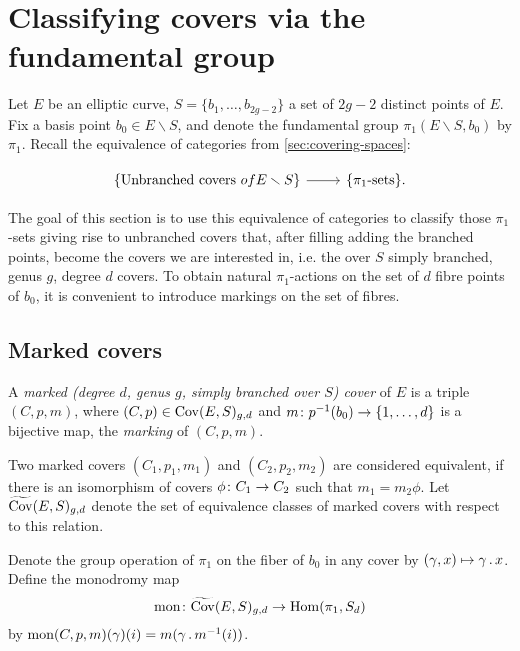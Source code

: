 \section{Classifying covers via the fundamental group}

Let $E$ be an elliptic curve, $S=\{b_1,\dotsc,b_{2g-2}\}$ a set of $2g-2$ distinct points of $E$. Fix a basis point $b_0\in E\smallsetminus S$, and denote the fundamental group $\pi_1(E\smallsetminus S, b_0)$ by $\pi_1$.
Recall the equivalence of categories from \ref{sec:covering-spaces}:

\[
 \begin{tikzcd}
  \{\text{Unbranched covers } of E\smallsetminus S\} \arrow{r} & \{\pi_1\text{-sets}\}.
 \end{tikzcd}
\]

The goal of this section is to use this equivalence of categories to classify those $\pi_1$-sets giving rise to unbranched covers that, after filling adding the branched points, become the covers we are interested in, i.e. the over $S$ simply branched, genus $g$, degree $d$ covers. To obtain natural $\pi_1$-actions on the set of $d$ fibre points of $b_0$, it is convenient to introduce markings on the set of fibres.

\subsection{Marked covers}

\begin{defi}
 A \emph{marked (degree $d$, genus $g$, simply branched over $S$) cover} of $E$ is a triple $(C,p,m)$, where $(C,p)\in \operatorname{Cov}(E,S)_{g,d}$ and $m\colon p^{-1}(b_0)\to \{1,\dotsc,d\}$ is a bijective map, the \emph{marking} of $(C,p,m)$.
 
 Two marked covers $(C_1,p_1,m_1)$ and $(C_2,p_2,m_2)$ are considered equivalent, if there is an isomorphism of covers $\phi\colon C_1 \to C_2$ such that $m_1=m_2\phi$. Let $\widetilde{\operatorname{Cov}}(E,S)_{g,d}$ denote the set of equivalence classes of marked covers with respect to this relation.
\end{defi}

\begin{defi}
 Denote the group operation of $\pi_1$ on the fiber of $b_0$ in any cover by $(\gamma,x)\mapsto \gamma\,.\, x$. Define the monodromy map \[\text{mon}\colon \widetilde{\operatorname{Cov}}(E,S)_{g,d} \to \operatorname{Hom}(\pi_1, S_d)\]
 by $\text{mon}(C,p,m)(\gamma)(i)=m(\gamma\,.\, m^{-1}(i))$.
\end{defi}

